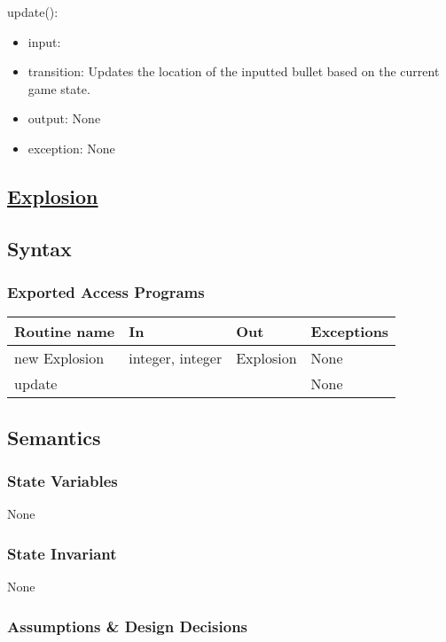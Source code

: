 \documentclass[12pt, titlepage]{article}
\begin{document}
\noindent update():
\begin{itemize}
\item input:  
\item transition: Updates the location of the inputted bullet based on the current game state.
\item output: None
\item exception: None
\end{itemize}

\subsection* {\underline{Explosion}} 
\subsection* {Syntax}

\subsubsection* {Exported Access Programs}

\begin{tabular}{| l | l | l | p{5cm} |}
\hline
\textbf{Routine name} & \textbf{In} & \textbf{Out} & \textbf{Exceptions}\\
\hline
new Explosion & integer, integer & Explosion & None\\
\hline
update & & & None\\
\hline
\end{tabular}

\subsection* {Semantics}

\subsubsection* {State Variables}

None

\subsubsection* {State Invariant}

None

\subsubsection* {Assumptions \& Design Decisions}
\end{document}
